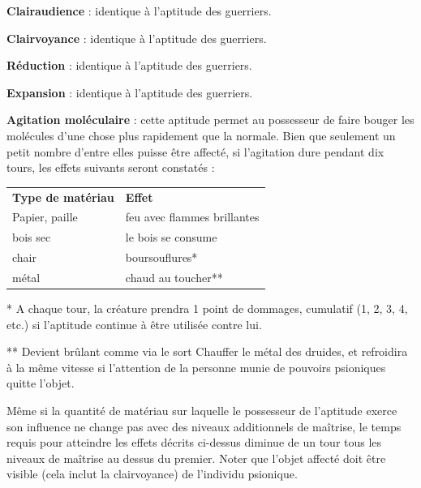 \documentclass[11pt]{article}
\begin{document}
{\bigskip

\textbf{Clairaudience} : identique à l'aptitude des guerriers.

\bigskip

\textbf{Clairvoyance} : identique à l'aptitude des guerriers.

\bigskip

\textbf{Réduction} : identique à l'aptitude des guerriers.

\bigskip

\textbf{Expansion} : identique à l'aptitude des guerriers.

\bigskip

\textbf{Agitation moléculaire} : cette aptitude permet au possesseur de faire bouger les molécules d'une chose plus rapidement que la normale. Bien que seulement un petit nombre d'entre elles puisse être affecté, si l'agitation dure pendant dix tours, les effets suivants seront constatés :

\medskip

\begin{tabular}{p{8cm}p{8cm}}
\textbf{Type de matériau} & \textbf{Effet} \\
Papier, paille & feu avec flammes brillantes \\
bois sec & le bois se consume \\
chair & boursouflures* \\
métal & chaud au toucher** \\
\end{tabular}

\bigskip

* A chaque tour, la créature prendra 1 point de dommages, cumulatif (1, 2, 3, 4, etc.) si l'aptitude continue à être utilisée contre lui.

\bigskip

** Devient brûlant comme via le sort Chauffer le métal des druides, et refroidira à la même vitesse si l'attention de la personne munie de pouvoirs psioniques quitte l'objet.

\bigskip

Même si la quantité de matériau sur laquelle le possesseur de l'aptitude exerce son influence ne change pas avec des niveaux additionnels de maîtrise, le temps requis pour atteindre les effets décrits ci-dessus diminue de un tour tous les niveaux de maîtrise au dessus du premier. Noter que l'objet affecté doit être visible (cela inclut la clairvoyance) de l'individu psionique.

\bigskip

}
\end{document}

